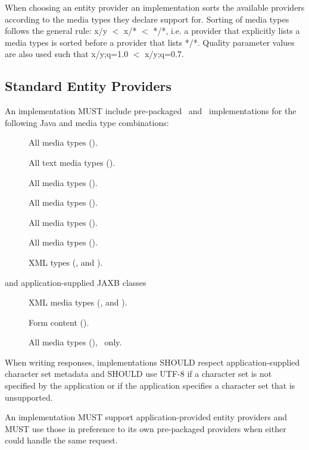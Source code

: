 When choosing an entity provider an implementation sorts the available providers according to the media types they declare support for. Sorting of media types follows the general rule: x/y $<$ x/* $<$ */*, i.e. a provider that explicitly lists a media types is sorted before a provider that lists */*. Quality parameter values are also used such that x/y;q=1.0 $<$ x/y;q=0.7.

\subsection{Standard Entity Providers}
\label{standard_entity_providers}

An implementation MUST include pre-packaged \MsgRead\ and \MsgWrite\ implementations for the following Java and media type combinations:

\begin{description}
\item[] All media types (\code{*/*}).
\item[] All text media types ().
\item[] All media types (\code{*/*}).
\item[] All media types (\code{*/*}).
\item[] All media types (\code{*/*}).
\item[] All media types (\code{*/*}).
\item[] XML types (,  and ).
\item[ and application-supplied JAXB classes] XML media types (,  and ).
\item[] Form content ().
\item[] All media types (\code{*/*}), \MsgWrite\ only.
\end{description}

When writing responses, implementations SHOULD respect application-supplied character set metadata and SHOULD use UTF-8 if a character set is not specified by the application or if the application specifies a character set that is unsupported.

An implementation MUST support application-provided entity providers and MUST use those in preference to its own pre-packaged providers when either could handle the same request.

